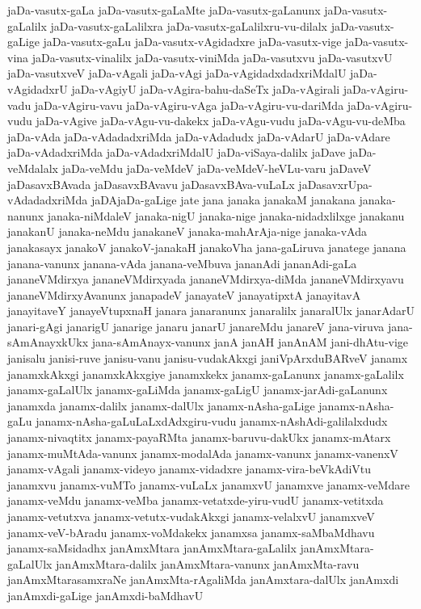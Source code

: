 {jaDa-vasutx-gaLa
jaDa-vasutx-gaLaMte
jaDa-vasutx-gaLanunx
jaDa-vasutx-gaLalilx
jaDa-vasutx-gaLalilxra
jaDa-vasutx-gaLalilxru-vu-dilalx
jaDa-vasutx-gaLige
jaDa-vasutx-gaLu
jaDa-vasutx-vAgidadxre
jaDa-vasutx-vige
jaDa-vasutx-vina
jaDa-vasutx-vinalilx
jaDa-vasutx-viniMda
jaDa-vasutxvu
jaDa-vasutxvU
jaDa-vasutxveV
jaDa-vAgali
jaDa-vAgi
jaDa-vAgidadxdadxriMdalU
jaDa-vAgidadxrU
jaDa-vAgiyU
jaDa-vAgira-bahu-daSeTx
jaDa-vAgirali
jaDa-vAgiru-vadu
jaDa-vAgiru-vavu
jaDa-vAgiru-vAga
jaDa-vAgiru-vu-dariMda
jaDa-vAgiru-vudu
jaDa-vAgive
jaDa-vAgu-vu-dakekx
jaDa-vAgu-vudu
jaDa-vAgu-vu-deMba
jaDa-vAda
jaDa-vAdadadxriMda
jaDa-vAdadudx
jaDa-vAdarU
jaDa-vAdare
jaDa-vAdadxriMda
jaDa-vAdadxriMdalU
jaDa-viSaya-dalilx
jaDave
jaDa-veMdalalx
jaDa-veMdu
jaDa-veMdeV
jaDa-veMdeV-heVLu-varu
jaDaveV
jaDasavxBAvada
jaDasavxBAvavu
jaDasavxBAva-vuLaLx
jaDasavxrUpa-vAdadadxriMda
jaDAjaDa-gaLige
jate
jana
janaka
janakaM
janakana
janaka-nanunx
janaka-niMdaleV
janaka-nigU
janaka-nige
janaka-nidadxlilxge
janakanu
janakanU
janaka-neMdu
janakaneV
janaka-mahArAja-nige
janaka-vAda
janakasayx
janakoV
janakoV-janakaH
janakoVha
jana-gaLiruva
janatege
janana
janana-vanunx
janana-vAda
janana-veMbuva
jananAdi
jananAdi-gaLa
jananeVMdirxya
jananeVMdirxyada
jananeVMdirxya-diMda
jananeVMdirxyavu
jananeVMdirxyAvanunx
janapadeV
janayateV
janayatipxtA
janayitavA
janayitaveY
janayeVtupxnaH
janara
janaranunx
janaralilx
janaralUlx
janarAdarU
janari-gAgi
janarigU
janarige
janaru
janarU
janareMdu
janareV
jana-viruva
jana-sAmAnayxkUkx
jana-sAmAnayx-vanunx
janA
janAH
janAnAM
jani-dhAtu-vige
janisalu
janisi-ruve
janisu-vanu
janisu-vudakAkxgi
janiVpArxduBARveV
janamx
janamxkAkxgi
janamxkAkxgiye
janamxkekx
janamx-gaLanunx
janamx-gaLalilx
janamx-gaLalUlx
janamx-gaLiMda
janamx-gaLigU
janamx-jarAdi-gaLanunx
janamxda
janamx-dalilx
janamx-dalUlx
janamx-nAsha-gaLige
janamx-nAsha-gaLu
janamx-nAsha-gaLuLaLxdAdxgiru-vudu
janamx-nAshAdi-galilalxdudx
janamx-nivaqtitx
janamx-payaRMta
janamx-baruvu-dakUkx
janamx-mAtarx
janamx-muMtAda-vanunx
janamx-modalAda
janamx-vanunx
janamx-vanenxV
janamx-vAgali
janamx-videyo
janamx-vidadxre
janamx-vira-beVkAdiVtu
janamxvu
janamx-vuMTo
janamx-vuLaLx
janamxvU
janamxve
janamx-veMdare
janamx-veMdu
janamx-veMba
janamx-vetatxde-yiru-vudU
janamx-vetitxda
janamx-vetutxva
janamx-vetutx-vudakAkxgi
janamx-velalxvU
janamxveV
janamx-veV-bAradu
janamx-voMdakekx
janamxsa
janamx-saMbaMdhavu
janamx-saMsidadhx
janAmxMtara
janAmxMtara-gaLalilx
janAmxMtara-gaLalUlx
janAmxMtara-dalilx
janAmxMtara-vanunx
janAmxMta-ravu
janAmxMtarasamxraNe
janAmxMta-rAgaliMda
janAmxtara-dalUlx
janAmxdi
janAmxdi-gaLige
janAmxdi-baMdhavU
}
